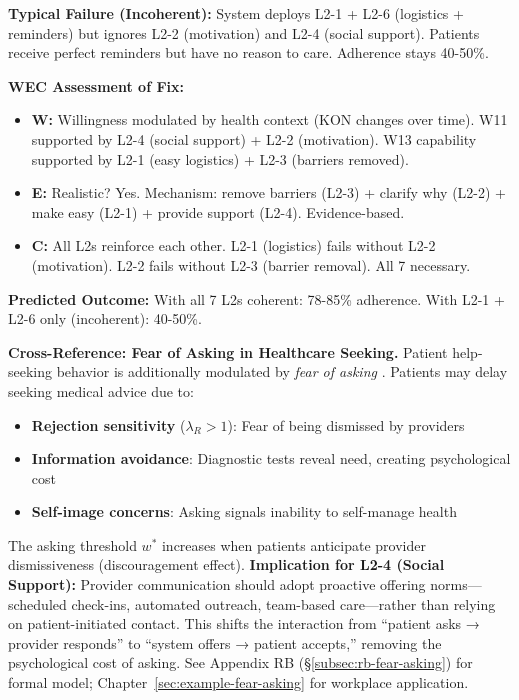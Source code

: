 \documentclass[11pt, a4paper]{article}
\begin{document}
\textbf{Typical Failure (Incoherent):} System deploys L2-1 + L2-6 (logistics + reminders) but ignores L2-2 (motivation) and L2-4 (social support). Patients receive perfect reminders but have no reason to care. Adherence stays 40-50\%.

\textbf{WEC Assessment of Fix:}
\begin{itemize}[nosep]
    \item \textbf{W:} Willingness modulated by health context (KON changes over time). W11 supported by L2-4 (social support) + L2-2 (motivation). W13 capability supported by L2-1 (easy logistics) + L2-3 (barriers removed).
    \item \textbf{E:} Realistic? Yes. Mechanism: remove barriers (L2-3) + clarify why (L2-2) + make easy (L2-1) + provide support (L2-4). Evidence-based.
    \item \textbf{C:} All L2s reinforce each other. L2-1 (logistics) fails without L2-2 (motivation). L2-2 fails without L2-3 (barrier removal). All 7 necessary.
\end{itemize}

\textbf{Predicted Outcome:} With all 7 L2s coherent: 78-85\% adherence. With L2-1 + L2-6 only (incoherent): 40-50\%.

\textbf{Cross-Reference: Fear of Asking in Healthcare Seeking.}
Patient help-seeking behavior is additionally modulated by \emph{fear of asking}
\citep{benabou2022hurts}. Patients may delay seeking medical advice due to:
\begin{itemize}[nosep]
    \item \textbf{Rejection sensitivity} ($\lambda_R > 1$): Fear of being dismissed by providers
    \item \textbf{Information avoidance}: Diagnostic tests reveal need, creating psychological cost
    \item \textbf{Self-image concerns}: Asking signals inability to self-manage health
\end{itemize}
The asking threshold $w^*$ increases when patients anticipate provider dismissiveness
(discouragement effect). \textbf{Implication for L2-4 (Social Support):} Provider
communication should adopt proactive offering norms---scheduled check-ins, automated
outreach, team-based care---rather than relying on patient-initiated contact. This
shifts the interaction from ``patient asks → provider responds'' to ``system offers
→ patient accepts,'' removing the psychological cost of asking. See Appendix RB
(\S\ref{subsec:rb-fear-asking}) for formal model; Chapter~\ref{sec:example-fear-asking}
for workplace application.
\end{document}
